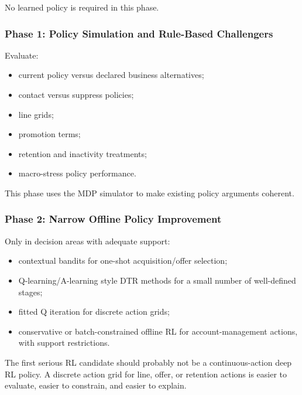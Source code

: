 \documentclass[
]{article}
\providecommand{\tightlist}{%
  \setlength{\itemsep}{0pt}\setlength{\parskip}{0pt}}
\begin{document}
No learned policy is required in this phase.

\hypertarget{phase-1-policy-simulation-and-rule-based-challengers}{%
\subsubsection{Phase 1: Policy Simulation and Rule-Based
Challengers}\label{phase-1-policy-simulation-and-rule-based-challengers}}

Evaluate:

\begin{itemize}
\tightlist
\item
  current policy versus declared business alternatives;
\item
  contact versus suppress policies;
\item
  line grids;
\item
  promotion terms;
\item
  retention and inactivity treatments;
\item
  macro-stress policy performance.
\end{itemize}

This phase uses the MDP simulator to make existing policy arguments
coherent.

\hypertarget{phase-2-narrow-offline-policy-improvement}{%
\subsubsection{Phase 2: Narrow Offline Policy
Improvement}\label{phase-2-narrow-offline-policy-improvement}}

Only in decision areas with adequate support:

\begin{itemize}
\tightlist
\item
  contextual bandits for one-shot acquisition/offer selection;
\item
  Q-learning/A-learning style DTR methods for a small number of
  well-defined stages;
\item
  fitted Q iteration for discrete action grids;
\item
  conservative or batch-constrained offline RL for account-management
  actions, with support restrictions.
\end{itemize}

The first serious RL candidate should probably not be a
continuous-action deep RL policy. A discrete action grid for line,
offer, or retention actions is easier to evaluate, easier to constrain,
and easier to explain.
\end{document}
